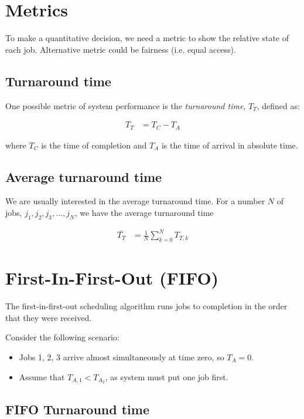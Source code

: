 \section{Metrics}

To make a quantitative decision, we need a metric to show the relative state of each job.
Alternative metric could be fairness (i.e. equal access).

\subsection{Turnaround time}

One possible metric of system performance is the \textit{turnaround time}, $T_T$, defined as: 

\begin{align}
  T_T & = T_C - T_A
\end{align}

where $T_C$ is the time of completion and $T_A$ is the time of arrival in absolute time.


\subsection{Average turnaround time}

We are usually interested in the average turnaround time.
For a number $N$ of jobs, $j_1, j_2, j_3, ..., j_N$, we have the average turnaround time

\begin{align}
  \bar{T_T} & = \frac{1}{N} \sum_{k=0}^{N} T_{T,k}
\end{align}


\section{First-In-First-Out (FIFO)}

The first-in-first-out scheduling algorithm runs jobs to completion in the order that they were received.

Consider the following scenario:
\begin{itemize}
\item Jobs 1, 2, 3 arrive almost simultaneously at time zero, so $T_A=0$.
\item Assume that $T_{A,1} < T_{A_2}$, as system must put one job first.
\end{itemize}

\subsection{FIFO Turnaround time}

